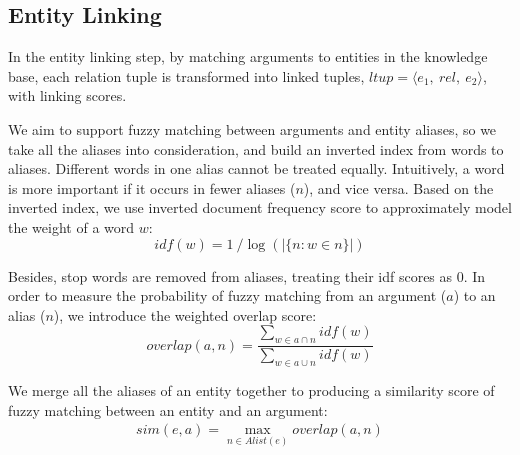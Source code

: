 \subsection{Entity Linking}


%


In the entity linking step, by matching arguments to entities in the knowledge base,
each relation tuple is transformed into linked tuples,
$ltup=\langle e_1,\ rel,\ e_2 \rangle$, with linking scores.




We aim to support fuzzy matching between arguments and entity aliases,
so we take all the aliases into consideration, and build an inverted index from words to aliases.
Different words in one alias cannot be treated equally. Intuitively, a word
is more important if it occurs in fewer aliases ($n$), and vice versa.
Based on the inverted index, we use inverted document frequency score to
approximately model the weight of a word $w$:
\begin{equation}
idf(w)=1\ /\log(|\{n : w \in n\}|)
\end{equation}

Besides, stop words are removed from aliases, treating their idf scores as 0.
In order to measure the probability of fuzzy matching from an argument ($a$) to an alias ($n$),
we introduce the weighted overlap score:
\begin{equation}
overlap(a, n) = \frac {\sum\limits_{w \in a \cap n} idf(w)} {\sum\limits_{w \in a \cup n} idf(w)}
\end{equation}

We merge all the aliases of an entity together to producing a similarity score 
of fuzzy matching between an entity and an argument:
\begin{equation}
\begin{aligned}
sim(e, a) = \max\limits_{n \in Alist(e)} overlap(a, n)
\end{aligned}
\end{equation}

